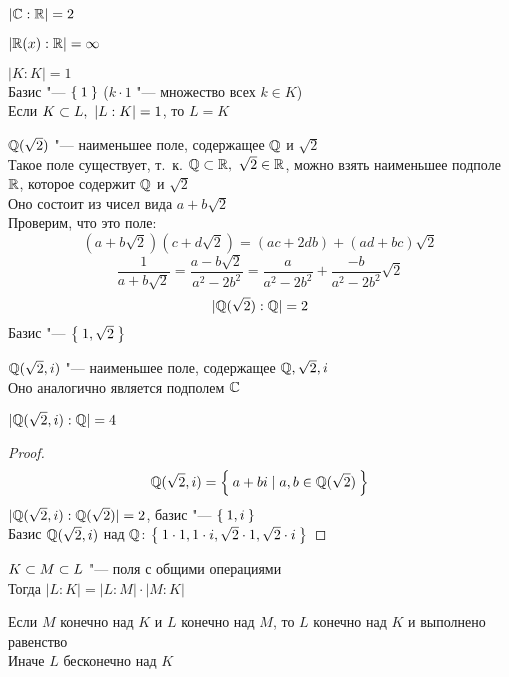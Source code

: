 \begin{exmpls}
	\item $ |\mathbb{C} : \mathbb{R}| = 2 $
	\item $ |\mathbb{R}(x) : \mathbb{R}| = \infty $
	\item $ |K : K| = 1 $ \\
	Базис "--- $ \Set1 $ ($ k \cdot 1 $ "--- множество всех $ k \in K $) \\
	Если $ K \subset L, ~ |L : K| = 1 $, то $ L = K $
	\item $ \mathbb{Q}(\sqrt2) $ "--- наименьшее поле, содержащее $ \mathbb{Q} $ и $ \sqrt2 $ \\
	Такое поле существует, т.~к. $ \mathbb{Q} \subset \mathbb{R}, ~ \sqrt2 \in \mathbb{R} $, можно взять наименьшее подполе $ \mathbb{R} $, которое содержит $ \mathbb{Q} $ и $ \sqrt2 $ \\
	Оно состоит из чисел вида $ a + b\sqrt2 $ \\
	Проверим, что это поле:
	$$ (a + b\sqrt2)(c + d\sqrt2) = (ac + 2db) + (ad + bc)\sqrt2 $$
	$$ \frac1{a + b\sqrt2} = \frac{a - b\sqrt2}{a^2 - 2b^2} = \frac{a}{a^2 - 2b^2} + \frac{-b}{a^2 - 2b^2}\sqrt2 $$
	$$ |\mathbb{Q}(\sqrt2) : \mathbb{Q}| = 2 $$
	Базис "--- $ \Set{1, \sqrt2} $
	\item $ \mathbb{Q}(\sqrt2, i) $ "--- наименьшее поле, содержащее $ \mathbb{Q}, \sqrt2, i $ \\
	Оно аналогично является подполем $ \mathbb{C} $
	\begin{statement}
		$ |\mathbb{Q}(\sqrt2, i) : \mathbb{Q}| = 4 $
	\end{statement}
	\begin{proof}
		$$ \mathbb{Q}(\sqrt2, i) = \Set{a + bi \mid a, b \in \ensuremath{\mathbb{Q}}(\sqrt2)} $$
		$ |\mathbb{Q}(\sqrt2, i) : \mathbb{Q}(\sqrt2)| = 2 $, базис "--- $ \Set{1, i} $ \\
		Базис $ \mathbb{Q}(\sqrt2, i) $ над $ \mathbb{Q} $: $ \Set{1 \cdot 1, 1 \cdot i, \sqrt2 \cdot 1, \sqrt2 \cdot i} $
	\end{proof}
\end{exmpls}

\begin{theorem}
	$ K \subset M \subset L $ "--- поля с общими операциями \\
	Тогда $ |L : K| = |L : M| \cdot |M : K| $
\end{theorem}

\begin{note}
	Если $ M $ конечно над $ K $ и $ L $ конечно над $ M $, то $ L $ конечно над $ K $ и выполнено равенство \\
	Иначе $ L $ бесконечно над $ K $
\end{note}

